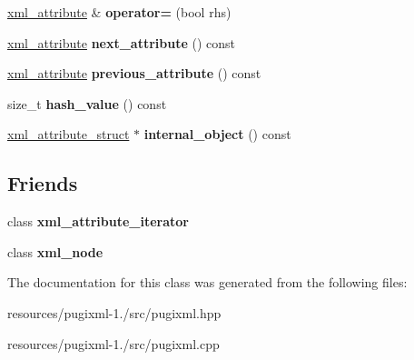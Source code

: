 \begin{DoxyCompactItemize}
\item 
\hypertarget{classpugi_1_1xml__attribute_ae23d29ab032d5ff7c875f5bbe4d6ab3c}{\hyperlink{classpugi_1_1xml__attribute}{xml\+\_\+attribute} \& {\bfseries operator=} (bool rhs)}\label{classpugi_1_1xml__attribute_ae23d29ab032d5ff7c875f5bbe4d6ab3c}

\item 
\hypertarget{classpugi_1_1xml__attribute_a71b0ee33f833781a94d6d35adfc0daac}{\hyperlink{classpugi_1_1xml__attribute}{xml\+\_\+attribute} {\bfseries next\+\_\+attribute} () const }\label{classpugi_1_1xml__attribute_a71b0ee33f833781a94d6d35adfc0daac}

\item 
\hypertarget{classpugi_1_1xml__attribute_aee4fc29d1645bddc70f1a174654b9d10}{\hyperlink{classpugi_1_1xml__attribute}{xml\+\_\+attribute} {\bfseries previous\+\_\+attribute} () const }\label{classpugi_1_1xml__attribute_aee4fc29d1645bddc70f1a174654b9d10}

\item 
\hypertarget{classpugi_1_1xml__attribute_a1c9776e159263d00082a395891d8470f}{size\+\_\+t {\bfseries hash\+\_\+value} () const }\label{classpugi_1_1xml__attribute_a1c9776e159263d00082a395891d8470f}

\item 
\hypertarget{classpugi_1_1xml__attribute_aa8543b8406bfddd2607c8dcdb54c5369}{\hyperlink{structpugi_1_1xml__attribute__struct}{xml\+\_\+attribute\+\_\+struct} $\ast$ {\bfseries internal\+\_\+object} () const }\label{classpugi_1_1xml__attribute_aa8543b8406bfddd2607c8dcdb54c5369}

\end{DoxyCompactItemize}
\subsection*{Friends}
\begin{DoxyCompactItemize}
\item 
\hypertarget{classpugi_1_1xml__attribute_aeff34dec57ee910e3344631528969539}{class {\bfseries xml\+\_\+attribute\+\_\+iterator}}\label{classpugi_1_1xml__attribute_aeff34dec57ee910e3344631528969539}

\item 
\hypertarget{classpugi_1_1xml__attribute_a156d917a92815c7b593bd5ef19f6d5fb}{class {\bfseries xml\+\_\+node}}\label{classpugi_1_1xml__attribute_a156d917a92815c7b593bd5ef19f6d5fb}

\end{DoxyCompactItemize}


The documentation for this class was generated from the following files\+:\begin{DoxyCompactItemize}
\item 
resources/pugixml-\/1./src/pugixml.\+hpp\item 
resources/pugixml-\/1./src/pugixml.\+cpp\end{DoxyCompactItemize}
